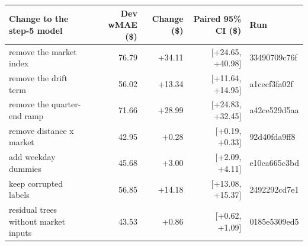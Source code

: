 \begin{tabular}{lrrrl}
\toprule
Change to the step-5 model & Dev wMAE (\$) & Change (\$) & Paired 95\% CI (\$) & Run \\
\midrule
remove the market index & 76.79 & +34.11 & [+24.65, +40.98] & 33490709c76f \\
remove the drift term & 56.02 & +13.34 & [+11.64, +14.95] & a1cecf3fa02f \\
remove the quarter-end ramp & 71.66 & +28.99 & [+24.83, +32.45] & a42ce529d5aa \\
remove distance x market & 42.95 & +0.28 & [+0.19, +0.33] & 92d40fda9ff8 \\
add weekday dummies & 45.68 & +3.00 & [+2.09, +4.11] & e10ca665c3bd \\
keep corrupted labels & 56.85 & +14.18 & [+13.08, +15.37] & 2492292cd7e1 \\
residual trees without market inputs & 43.53 & +0.86 & [+0.62, +1.09] & 0185e5309ed5 \\
\bottomrule
\end{tabular}
